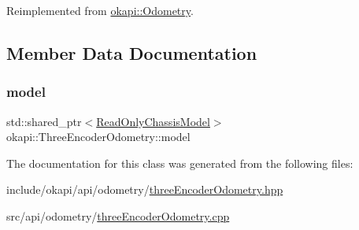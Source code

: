 Reimplemented from \mbox{\hyperlink{classokapi_1_1Odometry_a8fc2c3d72a0c475a7333eb9affe593a5}{okapi\+::\+Odometry}}.



\subsection{Member Data Documentation}
\mbox{\label{classokapi_1_1ThreeEncoderOdometry_ad2a5ed5af817d5d2cc6e49357fe6f1da}} 
\subsubsection{\texorpdfstring{model}{model}}
{\footnotesize\ttfamily std\+::shared\+\_\+ptr$<$\mbox{\hyperlink{classokapi_1_1ReadOnlyChassisModel}{Read\+Only\+Chassis\+Model}}$>$ okapi\+::\+Three\+Encoder\+Odometry\+::model\hspace{0.3cm}{\ttfamily [protected]}}



The documentation for this class was generated from the following files\+:\begin{DoxyCompactItemize}
\item 
include/okapi/api/odometry/\mbox{\hyperlink{threeEncoderOdometry_8hpp}{three\+Encoder\+Odometry.\+hpp}}\item 
src/api/odometry/\mbox{\hyperlink{threeEncoderOdometry_8cpp}{three\+Encoder\+Odometry.\+cpp}}\end{DoxyCompactItemize}
